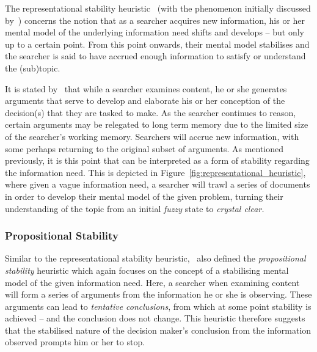 The representational stability heuristic~\citep{nickles1995judgment} (with the phenomenon initially discussed by~\cite{yates1982toward}) concerns the notion that as a searcher acquires new information, his or her mental model of the underlying information need shifts and develops -- but only up to a certain point. From this point onwards, their mental model stabilises and the searcher is said to have accrued enough information to satisfy or understand the (sub)topic.

It is stated by~\cite{nickles1995judgment} that while a searcher examines content, he or she generates arguments that serve to develop and elaborate his or her conception of the decision(s) that they are tasked to make. As the searcher continues to reason, certain arguments may be relegated to long term memory due to the limited size of the searcher's working memory. Searchers will accrue new information, with some perhaps returning to the original subset of arguments. As mentioned previously, it is this point that can be interpreted as a form of stability regarding the information need. This is depicted in Figure~\ref{fig:representational_heuristic}, where given a vague information need, a searcher will trawl a series of documents in order to develop their mental model of the given problem, turning their understanding of the topic from an initial \emph{fuzzy} state to \emph{crystal clear.}

\vspace*{-4mm}
\subsubsection{Propositional Stability}\label{sec:stopping_background:heuristics:propositional}
Similar to the representational stability heuristic,~\cite{nickles1995judgment} also defined the \emph{propositional stability} heuristic which again focuses on the concept of a stabilising mental model of the given information need. Here, a searcher when examining content will form a series of arguments from the information he or she is observing. These arguments can lead to \emph{tentative conclusions}, from which at some point stability is achieved -- and the conclusion does not change. This heuristic therefore suggests that the stabilised nature of the decision maker's conclusion from the information observed prompts him or her to stop.

\vspace*{-4mm}
